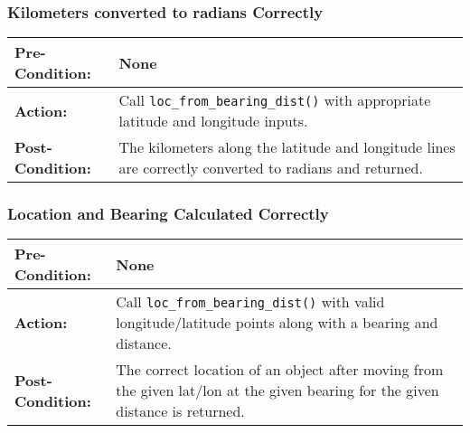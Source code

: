 \documentclass[titlepage]{article}
\newcommand{\testcase}[3]{
    \begin{center}
    \begin{tabular}{| l | p{0.7\textwidth}|}
        \hline
        \rowcolor[gray]{0.8}\textbf{Pre-Condition:} & #1 \\ \hline
        \textbf{Action:} & #2 \\ \hline
        \rowcolor[gray]{0.8}\textbf{Post-Condition:} & #3 \\ \hline
    \end{tabular}
    \end{center}
}
\begin{document}
\subsubsection{Kilometers converted to radians Correctly}
\testcase{None}{Call \texttt{loc\_from\_bearing\_dist()} with appropriate latitude and longitude inputs.}{The kilometers along the latitude and longitude lines are correctly converted to radians and returned.}

\subsubsection{Location and Bearing Calculated Correctly}
\testcase{None}{Call \texttt{loc\_from\_bearing\_dist()} with valid longitude/latitude points along with a bearing and distance.}{The correct location of an object after moving from the given lat/lon at the given bearing for the given distance is returned.}

\pagebreak
\appendix
\appendixpage
\end{document}
